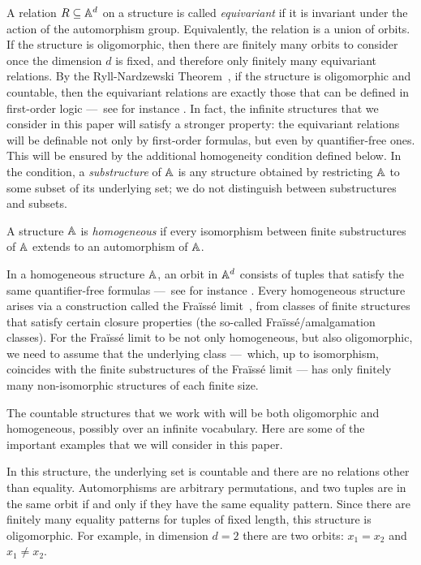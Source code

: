 A relation $R \subseteq \mathbb{A}^d$ on a structure is called \emph{equivariant} if it is invariant under the action of the automorphism group. Equivalently, the relation is a union of orbits.  If the structure is oligomorphic, then there are finitely many orbits to consider once the dimension $d$ is fixed, and therefore  only finitely many equivariant relations. By the Ryll-Nardzewski Theorem~\cite[Thm.~7.3.1]{hodges1993model}, if the structure is oligomorphic and countable, then the equivariant relations are exactly those that can be defined in first-order logic ---~see for instance \cite[Lem.~5.9]{bojanczyk_slightly}. In fact, the infinite structures that we consider in this paper will satisfy a stronger property: the equivariant relations will be definable not only by first-order formulas, but even by quantifier-free ones. This will be ensured by the additional homogeneity condition defined below. In the condition, a \emph{substructure} of $\mathbb{A}$ is any structure obtained by restricting $\mathbb{A}$ to some subset  of its underlying set; we do not distinguish between substructures and subsets.

\begin{definition}
     A structure $\mathbb{A}$ is \emph{homogeneous} if every isomorphism between finite substructures of $\mathbb{A}$ extends to an automorphism of $\mathbb{A}$.
\end{definition}

In a homogeneous structure $\mathbb{A}$, an orbit in $\mathbb{A}^d$ consists of tuples that satisfy the same quantifier-free formulas ---~see for instance \cite[Thm.~6.3]{bojanczyk_slightly}. 
Every homogeneous structure arises via a construction called the Fraïssé limit~\cite[Sec.~7.4]{hodges1993model}, from classes of finite structures that satisfy certain closure properties (the so-called Fraïssé/amalgamation classes). 
For the Fraïssé limit to be not only homogeneous, but also oligomorphic, we need to assume that the underlying class ---~which, up to isomorphism, coincides with the finite substructures of the Fraïssé limit --- has only finitely many non-isomorphic structures of each finite size. 

The countable structures that we work with will be both oligomorphic and homogeneous, possibly over an infinite vocabulary. 
Here are some of the important examples that we will consider in this paper.

\begin{myexample} \label{ex:equality-atoms} In this structure, the underlying set is countable and there are no relations other than equality.  Automorphisms are arbitrary permutations, and two tuples are in the same orbit if and only if they have the same equality pattern. Since there are finitely many equality patterns for tuples of fixed length, this structure is oligomorphic. For example, in dimension $d=2$ there are two orbits: $x_1=x_2$ and $x_1 \neq x_2$.
\end{myexample}

